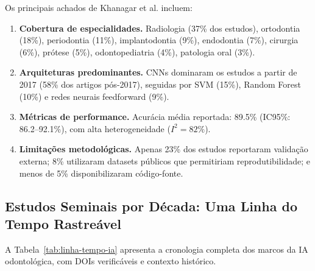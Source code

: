 Os principais achados de Khanagar et al. incluem:

\begin{enumerate}
    \item \textbf{Cobertura de especialidades.} Radiologia (37\% dos estudos), ortodontia (18\%), periodontia (11\%), implantodontia (9\%), endodontia (7\%), cirurgia (6\%), prótese (5\%), odontopediatria (4\%), patologia oral (3\%).
    \item \textbf{Arquiteturas predominantes.} CNNs dominaram os estudos a partir de 2017 (58\% dos artigos pós-2017), seguidas por SVM (15\%), Random Forest (10\%) e redes neurais feedforward (9\%).
    \item \textbf{Métricas de performance.} Acurácia média reportada: 89.5\% (IC95\%: 86.2--92.1\%), com alta heterogeneidade ($I^2 = 82\%$).
    \item \textbf{Limitações metodológicas.} Apenas 23\% dos estudos reportaram validação externa; 8\% utilizaram datasets públicos que permitiriam reprodutibilidade; e menos de 5\% disponibilizaram código-fonte.
\end{enumerate}

\subsection{Estudos Seminais por Década: Uma Linha do Tempo Rastreável}

A Tabela~\ref{tab:linha-tempo-ia} apresenta a cronologia completa dos marcos da IA odontológica, com DOIs verificáveis e contexto histórico.

